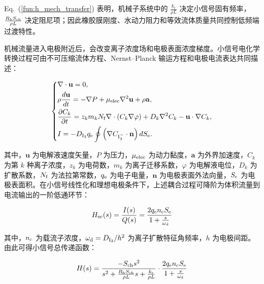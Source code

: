 \documentclass[sn-nature]{sn-jnl}
\newcommand{\kr}{k_{\text{r}}} %
\begin{document}
Eq.~(\ref{fun:h_mech_transfer}) 表明，机械子系统中的 $\frac{\kr}{\rho L}$ 决定小信号固有频率，$\frac{R_{\text{h}} S_{\rm ch}}{\rho L}$ 决定阻尼项；因此橡胶膜刚度、水动力阻力和等效流体质量共同控制低频端过渡特性。

机械流量进入电极附近后，会改变离子浓度场和电极表面浓度梯度。小信号电化学转换过程可由不可压缩流体方程、Nernst--Planck 输运方程和电极电流表达共同描述\cite{sun_influence_2011,sun_numerical_2012}：

\begin{equation}
    \left\{
    \begin{aligned}
         & \nabla \cdot \mathbf{u} = 0, \\
         & \rho \frac{d\mathbf{u}}{dt} = -\nabla P + \mu_{\rm elec}\nabla^2\mathbf{u} + \rho \mathbf{a}, \\
         & \frac{\partial C_k}{\partial t} =
         z_k m_k N_{\rm f} \nabla \cdot \left(C_k \nabla \varphi\right)
         + D_k \nabla^2 C_k - \mathbf{u}\cdot\nabla C_k, \\
         & I = -D_{\mathrm{I}_3} q_{\rm e} \oint
         \left(\nabla C_{\mathrm{I}_3^-}\cdot\mathbf{n}\right)dS_{\rm e}.
    \end{aligned}
    \label{eq:small_signal_transport}
    \right.
\end{equation}

其中，$\mathbf{u}$ 为电解液速度矢量，$P$ 为压力，$\mu_{\rm elec}$ 为动力黏度，$\mathbf{a}$ 为外界加速度，$C_k$ 为第 $k$ 种离子浓度，$z_k$ 为电荷数，$m_k$ 为离子迁移系数，$\varphi$ 为电解液电位，$D_k$ 为扩散系数，$N_{\rm f}$ 为法拉第常数，$q_{\rm e}$ 为电子电量，$\mathbf{n}$ 为电极表面外法向量，$S_{\rm e}$ 为电极表面积。在小信号线性化和理想电极条件下，上述耦合过程可降阶为体积流量到电流输出的一阶低通环节\cite{kozlov_frequency_2002,WOS:000318036400036}：

\begin{equation}
    H_{\rm ec}(s) = \frac{I(s)}{Q(s)} = \frac{2 q_{\rm e} n_{\rm c} S_{\rm e}}{1 + \frac{s}{\omega_{\rm d}}}
    \label{fun:h_ec_transfer}
\end{equation}

其中，$n_{\rm c}$ 为载流子浓度，$\omega_{\rm d}=D_{\mathrm{I}_3}/h^2$ 为离子扩散特征角频率，$h$ 为电极间距。由此可得小信号总传递函数：

\begin{equation}
    H(s) = \frac{- S_{\rm ch} s^2}{s^2 + \frac{R_{\text{h}} S_{\rm ch}}{\rho L}s + \frac{\kr}{\rho L }}
    \cdot
    \frac{2 q_{\rm e} n_{\rm c} S_{\rm e}}{1 + \frac{s}{\omega_{\rm d}}}
    \label{fun:h_transfer}
\end{equation}
\end{document}
